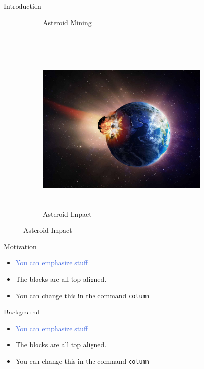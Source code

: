 \documentclass[final, usenames, dvipsnames]{beamer}
\newlength{\onecolwidth}
\newlength{\twocolwidth}
\def\Emph{\textcolor{RoyalBlue}}
\begin{document}
\begin{frame}[t]
\begin{columns}[T,onlytextwidth]
\begin{column}{\onecolwidth}
\begin{block}{Introduction}
\begin{figure}
\begin{subfigure}[b]{0.4\columnwidth}
	        \caption*{Asteroid Mining}%
        \end{subfigure}~\hfill 
        \begin{subfigure}[b]{0.4\columnwidth}%
            \includegraphics[height=8.5cm]{figures/asteroid-alamy.jpg}%
            \caption*{Asteroid Impact}%
        \end{subfigure}%
        \hfill%
	\end{figure}
\end{block} %

\begin{block}{Motivation}
	\begin{itemize}
		\item \Emph{You can emphasize stuff} 
		\item The blocks are all top aligned. 
		\item You can change this in the command \texttt{column}
	\end{itemize}
\end{block} 

\begin{block}{Background}
	\begin{itemize}
		\item \Emph{You can emphasize stuff} 
		\item The blocks are all top aligned. 
		\item You can change this in the command \texttt{column}
	\end{itemize}
\end{block} 

\end{column}  %

\begin{column}{\twocolwidth} %


\end{column}
\end{columns}
\end{frame}
\end{document}

